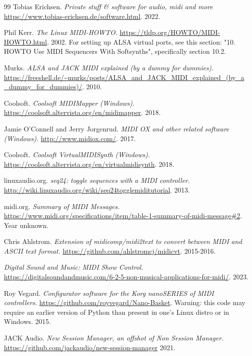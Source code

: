 {\begin{thebibliography}{99}
   Tobias Erichsen.
   \emph{Private stuff \& software for audio, midi and more}
   \url{https://www.tobias-erichsen.de/software.html}.
   2022.

   Phil Kerr.
   \emph{The Linux MIDI-HOWTO.}
   \url{https://tldp.org/HOWTO/MIDI-HOWTO.html}.
   2002.
   For setting up ALSA virtual ports, see this
   section: "10. HOWTO Use MIDI Sequencers With Softsynths",
   specifically section 10.2.

   Murks.
   \emph{ALSA and JACK MIDI explained (by a dummy for dummies).}
   \url{https://freeshell.de/~murks/posts/ALSA_and_JACK_MIDI_explained_(by_a_dummy_for_dummies)/}.
   2010.

   Coolsoft.
   \emph{Coolsoft MIDIMapper (Windows).}
   \url{https://coolsoft.altervista.org/en/midimapper}.
   2018.

   Jamie O'Connell and Jerry Jorgenrud.
   \emph{MIDI OX and other related software (Windows).}
   \url{http://www.midiox.com/}.
   2017.

   Coolsoft.
   \emph{Coolsoft VirtualMIDISynth (Windows).}
   \url{https://coolsoft.altervista.org/en/virtualmidisynth}.
   2018.

   linuxaudio.org.
   \emph{seq24: toggle sequences with a MIDI controller.}
   \url{http://wiki.linuxaudio.org/wiki/seq24togglemiditutorial}.
   2013.

   midi.org.
   \emph{Summary of MIDI Messages.}
   \url{https://www.midi.org/specifications/item/table-1-summary-of-midi-message#2}.
   Year unknown.

   Chris Ahlstrom.
   \emph{Extension of midicomp/midi2text to convert between MIDI and ASCII
      text format.}
   \url{https://github.com/ahlstromcj/midicvt}.
   2015-2016.

   \emph{Digital Sound and Music: MIDI Show Control.}
   \url{https://digitalsoundandmusic.com/6-2-5-non-musical-applications-for-midi/}.
   2023.

   Roy Vegard.
   \emph{Configurator software for the Korg nanoSERIES of MIDI controllers.}
   \url{https://github.com/royvegard/Nano-Basket}.
   Warning: this code may require an earlier version of Python than present in
   one's Linux distro or in Windows.
   2015.

   JACK Audio.
   \emph{New Session Manager, an offshot of Non Session Manager.}
   \url{https://github.com/jackaudio/new-session-manager}
   2021.


\end{thebibliography}}

